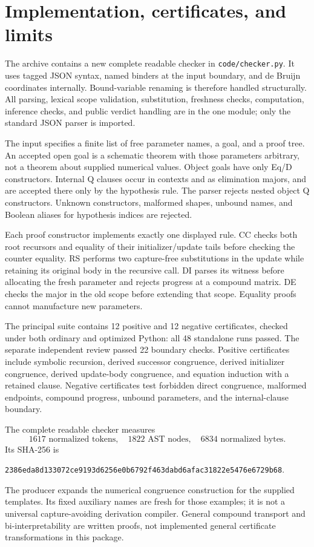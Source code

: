 \documentclass[11pt,letterpaper]{article}
\theoremstyle{definition}\newtheorem{definition}[theorem]{Definition}
\theoremstyle{remark}\newtheorem{remark}[theorem]{Remark}
\newcommand{\file}[1]{{\small\nolinkurl{#1}}}
\begin{document}
\section{Implementation, certificates, and limits}
\label{sec:implementation}

The archive contains a new complete readable checker in
\file{code/checker.py}. It uses tagged JSON syntax, named binders at the
input boundary, and de Bruijn coordinates internally. Bound-variable
renaming is therefore handled structurally. All parsing, lexical scope
validation, substitution, freshness checks, computation, inference
checks, and public verdict handling are in the one module; only the
standard JSON parser is imported.

The input specifies a finite list of free parameter names, a goal, and
a proof tree. An accepted open goal is a schematic theorem with those
parameters arbitrary, not a theorem about supplied numerical values.
Object goals have only Eq/D constructors. Internal Q clauses occur in
contexts and as elimination majors, and are accepted there only by the
hypothesis rule. The parser rejects nested object Q constructors.
Unknown constructors, malformed shapes, unbound names, and Boolean
aliases for hypothesis indices are rejected.

Each proof constructor implements exactly one displayed rule. CC checks
both root recursors and equality of their initializer/update tails
before checking the counter equality. RS performs two capture-free
substitutions in the update while retaining its original body in the
recursive call. DI parses its witness before allocating the fresh
parameter and rejects progress at a compound matrix. DE checks the
major in the old scope before extending that scope. Equality proofs
cannot manufacture new parameters.

The principal suite contains 12 positive and 12 negative certificates,
checked under both ordinary and optimized Python: all 48 standalone runs
passed. The separate independent review passed 22 boundary checks.
Positive certificates include symbolic recursion, derived successor
congruence, derived initializer congruence, derived update-body congruence,
and equation induction with a retained clause. Negative certificates test
forbidden direct congruence, malformed endpoints, compound progress,
unbound parameters, and the internal-clause boundary.

The complete readable checker measures
\[
 \boxed{1617\text{ normalized tokens},\quad1822\text{ AST nodes},\quad
        6834\text{ normalized bytes}.}
\]
Its SHA-256 is
\begin{center}\scriptsize\texttt{2386eda8d133072ce9193d6256e0b6792f463dabd6afac31822e5476e6729b68}.
\end{center}
The producer expands the numerical congruence construction for the
supplied templates. Its fixed auxiliary names are fresh for those
examples; it is not a universal capture-avoiding derivation compiler.
General compound transport and bi-interpretability are written proofs,
not implemented general certificate transformations in this package.
\end{document}
